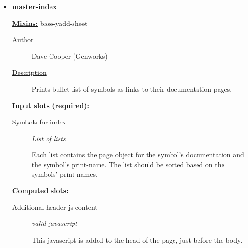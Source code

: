 \documentclass [11pt]{book}
\begin{document}
\begin{itemize}
\begin{description}
\end{description}







\item {}
\label{prim:master-index}
\textbf{master-index}


\textbf{
\underline{Mixins:}} base-yadd-sheet





\begin{description}

\item [
\underline{Author}]


Dave Cooper (Genworks)



\item [
\underline{Description}]


Prints bullet list of symbols as links to their documentation pages.



\end{description}








\textbf{
\underline{Input slots (required):}}

\begin{description}

\item [Symbols-for-index]
\emph{List of lists}

 Each list contains the page object for the symbol's
documentation and the symbol's print-name. The list should be sorted
based on the symbols' print-names.




\end{description}






\textbf{
\underline{Computed slots:}}

\begin{description}

\item [Additional-header-js-content]
\emph{valid javascript}

 This javascript is added to the head of the page, just before the body.





\end{description}
\end{itemize}
\end{document}
